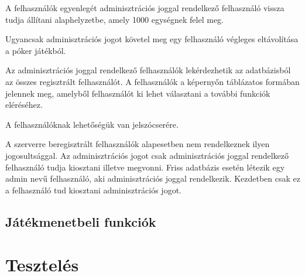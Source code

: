 A felhasználók egyenlegét adminisztrációs joggal rendelkező felhasználó vissza tudja állítani alaphelyzetbe, amely 1000 egységnek felel meg.

Ugyancsak adminisztrációs jogot követel meg egy felhasználó végleges eltávolítása a póker játékból.

Az adminisztrációs joggal rendelkező felhasználók lekérdezhetik az adatbázisból az összes regisztrált felhasználót. A felhasználók a képernyőn táblázatos formában jelennek meg, amelyből felhasználót ki lehet választani a további funkciók eléréséhez.

A felhasználóknak lehetőségük van jelszócserére.

A szerverre beregisztrált felhasználók alapesetben nem rendelkeznek ilyen jogosultsággal. Az adminisztrációs jogot csak adminisztrációs joggal rendelkező felhasználó tudja kiosztani illetve megvonni. Friss adatbázis esetén létezik egy admin nevű felhasználó, aki adminisztrációs joggal rendelkezik. Kezdetben csak ez a felhasználó tud kiosztani adminisztrációs jogot.

\subsection{Játékmenetbeli funkciók}

\section{Tesztelés}
